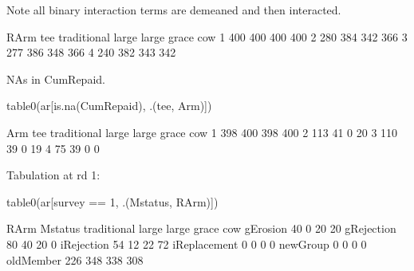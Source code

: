 Note all binary interaction terms are demeaned and then interacted.
\begin{Schunk}
\begin{Soutput}
   RArm
tee traditional large large grace cow
  1         400   400         400 400
  2         280   384         342 366
  3         277   386         348 366
  4         240   382         343 342
\end{Soutput}
\end{Schunk}
NAs in \textsf{CumRepaid}.
\begin{Schunk}
\begin{Sinput}
table0(ar[is.na(CumRepaid), .(tee, Arm)])
\end{Sinput}
\begin{Soutput}
   Arm
tee traditional large large grace cow
  1         398   400         398 400
  2         113    41           0  20
  3         110    39           0  19
  4          75    39           0   0
\end{Soutput}
\end{Schunk}
Tabulation at rd 1:
\begin{Schunk}
\begin{Sinput}
table0(ar[survey == 1, .(Mstatus, RArm)])
\end{Sinput}
\begin{Soutput}
              RArm
Mstatus        traditional large large grace cow
  gErosion              40     0          20  20
  gRejection            80    40          20   0
  iRejection            54    12          22  72
  iReplacement           0     0           0   0
  newGroup               0     0           0   0
  oldMember            226   348         338 308
\end{Soutput}
\end{Schunk}
